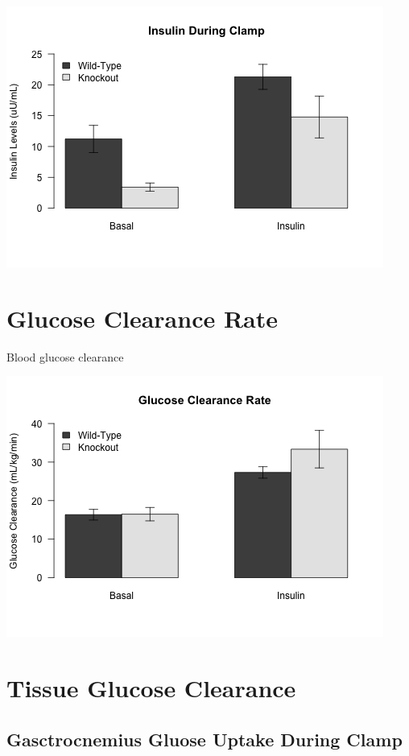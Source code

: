 \documentclass[]{article}
\begin{document}
\includegraphics{figures/insulin-1.png}

\section{Glucose Clearance Rate}\label{glucose-clearance-rate}

Blood glucose clearance

\includegraphics{figures/glucose-clearance-1.png}

\section{Tissue Glucose Clearance}\label{tissue-glucose-clearance}

\subsection{Gasctrocnemius Gluose Uptake During
Clamp}\label{gasctrocnemius-gluose-uptake-during-clamp}
\end{document}
